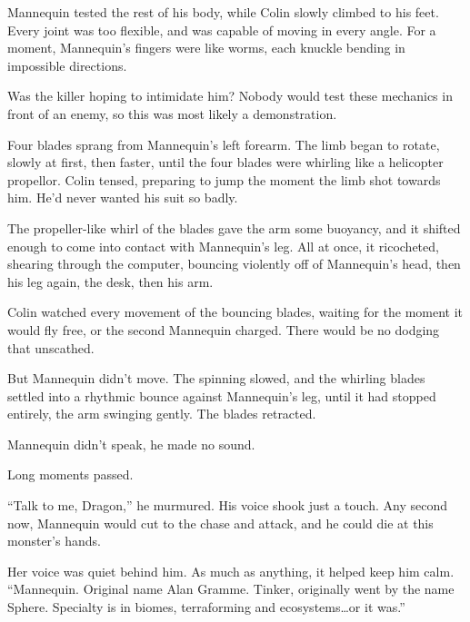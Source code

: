 Mannequin tested the rest of his body, while Colin slowly climbed to his feet.  Every joint was too flexible, and was capable of moving in every angle.  For a moment, Mannequin's fingers were like worms, each knuckle bending in impossible directions.



Was the killer hoping to intimidate him?  Nobody would test these mechanics in front of an enemy, so this was most likely a demonstration.



Four blades sprang from Mannequin's left forearm.  The limb began to rotate, slowly at first, then faster, until the four blades were whirling like a helicopter propellor.  Colin tensed, preparing to jump the moment the limb shot towards him.  He'd never wanted his suit so badly.



The propeller-like whirl of the blades gave the arm some buoyancy, and it shifted enough to come into contact with Mannequin's leg.  All at once, it ricocheted, shearing through the computer, bouncing violently off of Mannequin's head, then his leg again, the desk, then his arm.



Colin watched every movement of the bouncing blades, waiting for the moment it would fly free, or the second Mannequin charged.  There would be no dodging that unscathed.



But Mannequin didn't move.  The spinning slowed, and the whirling blades settled into a rhythmic bounce against Mannequin's leg, until it had stopped entirely, the arm swinging gently.  The blades retracted.



Mannequin didn't speak, he made no sound.



Long moments passed.



``Talk to me, Dragon,'' he murmured.  His voice shook just a touch.  Any second now, Mannequin would cut to the chase and attack, and he could die at this monster's hands.



Her voice was quiet behind him.  As much as anything, it helped keep him calm.  ``Mannequin.  Original name Alan Gramme.  Tinker, originally went by the name Sphere.  Specialty is in biomes, terraforming and ecosystems\ldots or it was.''



